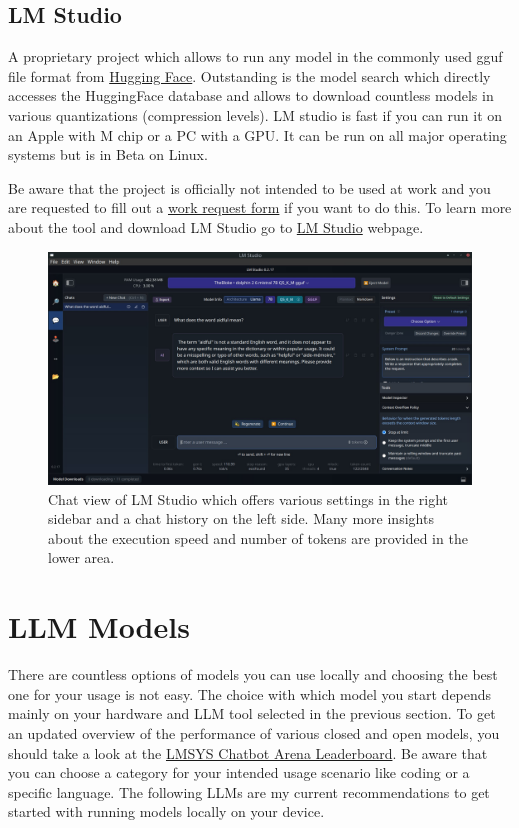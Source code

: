 \documentclass[parskip=half]{scrreprt} %
\begin{document}
\subsection{LM Studio}
A proprietary project which allows to run any model in the commonly used gguf file format from \href{https://huggingface.co}{Hugging Face}. Outstanding is the model search which directly accesses the HuggingFace database and allows to download countless models in various quantizations (compression levels).
LM studio is fast if you can run it on an Apple with M chip or a PC with a GPU. It can be run on all major operating systems but is in Beta on Linux.

Be aware that the project is officially not intended to be used at work and you are requested to fill out a \href{https://docs.google.com/forms/d/e/1FAIpQLSd-zGyQIVlSSqzRyM4YzPEmdNehW3iCd3_X8np5NWCD_1G3BA/viewform?usp=sf_link}{work request form} if you want to do this.
To learn more about the tool and download LM Studio go to \href{https://lmstudio.ai}{LM Studio} webpage.

\begin{figure}[h]
	\includegraphics[width=\textwidth]{LM Studio}
	\caption{Chat view of LM Studio which offers various settings in the right sidebar and a chat history on the left side.
Many more insights about the execution speed and number of tokens are provided in the lower area.}
	\label{fig:lmstudio}
\end{figure}

\section{LLM Models}
There are countless options of models you can use locally and choosing the best one for your usage is not easy.
The choice with which model you start depends mainly on your hardware and LLM tool selected in the previous section.
To get an updated overview of the performance of various closed and open models, you should take a look at the \href{https://arena.lmsys.org}{LMSYS Chatbot Arena Leaderboard}. Be aware that you can choose a category for your intended usage scenario like coding or a specific language.
The following LLMs are my current recommendations to get started with running models locally on your device.
\end{document}
